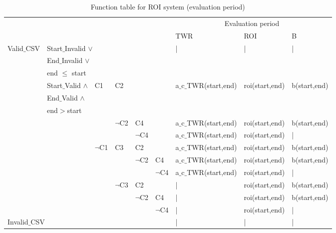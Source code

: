 \documentclass[runningheads,12pt]{article}
\begin{document}
\newpage
\begin{landscape}
\begin{table}
\centering

\begin{tabular}{|l|l|l|l|l|l||l|l|l|}
\hline
\multicolumn{6}{|c||}{} & \multicolumn{3}{|c|}{Evaluation period}\\ 

\multicolumn{6}{|c||}{} & TWR & ROI & B\\ 


\hline
Valid$\_$CSV & \multicolumn{5}{|l||}{Start$\_$Invalid $\vee$ } & | & | & |\\ 
& \multicolumn{5}{|l||}{End$\_$Invalid $\vee$} & &&\\
& \multicolumn{5}{|l||}{end $\le$ start}& & &\\

\cline{2-9}
& Start$\_$Valid  $\wedge$ & C1 & \multicolumn{3}{|l||}{C2} & a$\_$c$\_$TWR(start,end) & roi(start,end) & b(start,end)\\
& End$\_$Valid $\wedge$& &\multicolumn{3}{|l||}{}&&&\\
& end$>$start &&\multicolumn{3}{|l||}{}&&&\\

\cline{4-9}
& & & $\lnot$C2 &\multicolumn{2}{|l||}{C4} & a$\_$c$\_$TWR(start,end) & roi(start,end) & b(start,end)\\

\cline{5-9}
& & & &\multicolumn{2}{|l||}{$\lnot$C4} & a$\_$c$\_$TWR(start,end) & roi(start,end) & |\\

\cline{3-9}
& & $\lnot$C1 & C3 &\multicolumn{2}{|l||}{C2} & a$\_$c$\_$TWR(start,end) & roi(start,end) & b(start,end)\\

\cline{5-9}
& & & & $\lnot$C2 & C4 & a$\_$c$\_$TWR(start,end) & roi(start,end) & b(start,end)\\

\cline{6-9}
& & & & & $\lnot$C4 & a$\_$c$\_$TWR(start,end) & roi(start,end) & |\\

\cline{4-9}
& & & $\lnot$C3 &\multicolumn{2}{|l||}{C2} & | & roi(start,end) & b(start,end)\\

\cline{5-9}
& & & & $\lnot$C2 & C4 & | & roi(start,end) & b(start,end)\\

\cline{6-9}
& & & & & $\lnot$C4 & | & roi(start,end) & |\\


\hline
\multicolumn{6}{|l||}{Invalid$\_$CSV} & | & | & |\\ 


\hline
\end{tabular}




\caption{Function table for ROI system (evaluation period)}
\label{table:table_ROI_2}
\end{table}
\end{landscape}
\end{document}
